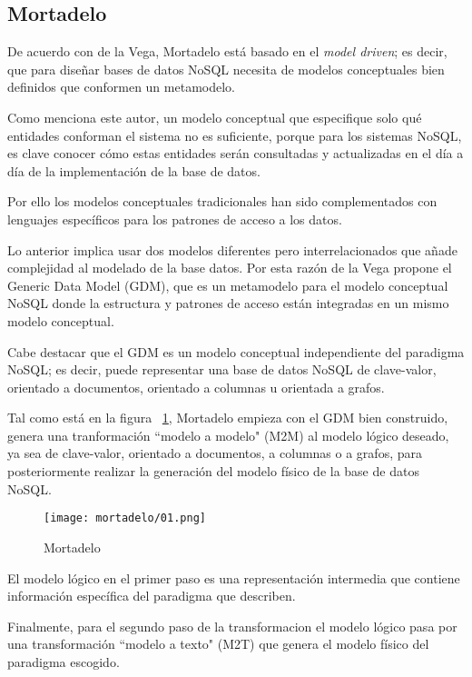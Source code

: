 \subsection{Mortadelo}
De acuerdo con de la Vega\cite{de_la_vega_mortadelo_2020}, Mortadelo está basado en el \textit{model driven}; es decir, que para diseñar bases de datos NoSQL necesita de modelos conceptuales bien definidos que conformen un metamodelo.


Como menciona este autor, un modelo conceptual que especifique solo qué entidades conforman el sistema no es suficiente, porque para los sistemas NoSQL, es clave conocer cómo estas entidades serán consultadas y actualizadas en el día a día de la implementación de la base de datos.


Por ello los modelos conceptuales tradicionales han sido complementados con lenguajes específicos para los patrones de acceso a los datos.


Lo anterior implica usar dos modelos diferentes pero interrelacionados que añade complejidad al modelado de la base datos. Por esta razón de la Vega propone el Generic Data Model (GDM), que es un metamodelo para el modelo conceptual NoSQL donde la estructura y patrones de acceso están integradas en un mismo modelo conceptual.


Cabe destacar que el GDM es un modelo conceptual independiente del paradigma NoSQL; es decir, puede representar una base de datos NoSQL de clave-valor, orientado a documentos, orientado a columnas u orientada a grafos.


Tal como está en la figura ~\ref{img:mortadelo-process}, Mortadelo empieza con el GDM bien construido, genera una tranformación ``modelo a modelo" (M2M) al modelo lógico deseado, ya sea de clave-valor, orientado a documentos, a columnas o a grafos, para posteriormente realizar la generación del modelo físico de la base de datos NoSQL.


\begin{figure}[h!t] 
    \centering
    \texttt{[image: mortadelo/01.png]}
    \caption{Mortadelo}
    \label{img:mortadelo-process}
\end{figure}


El modelo lógico en el primer paso es una representación intermedia que contiene información específica del paradigma que describen.


Finalmente, para el segundo paso de la transformacion el modelo lógico pasa por una transformación ``modelo a texto"  (M2T) que genera el modelo físico del paradigma escogido.

